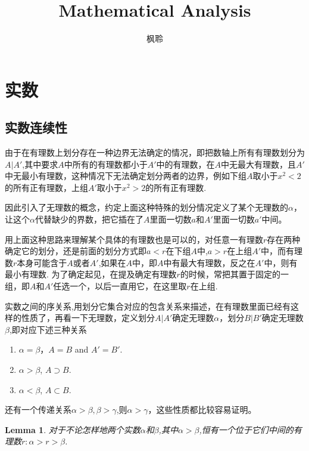 \documentclass{article}
\newtheorem{lemma}[theorem]{Lemma}
\begin{document}
\title{Mathematical Analysis}
\author{枫聆}
\maketitle
\tableofcontents

\newpage
\section{实数}
\subsection{实数连续性}

由于在有理数上划分存在一种边界无法确定的情况，即把数轴上所有有理数划分为$A|A'$,其中要求$A$中所有的有理数都小于$A'$中的有理数，在$A$中无最大有理数，且$A'$中无最小有理数，这种情况下{\color{red}无法确定划分两者的边界}，例如下组$A$取小于$x^2 < 2$的所有正有理数，上组$A'$取小于$x^2 > 2$的所有正有理数. 

因此引入了无理数的概念，约定上面这种特殊的划分情况定义了某个无理数的$\alpha$，让这个$\alpha$代替缺少的界数，把它插在了$A$里面一切数$a$和$A'$里面一切数$a'$中间。

用上面这种思路来理解某个具体的有理数也是可以的，对任意一有理数$r$存在两种确定它的划分，还是前面的划分方式即$a < r$在下组$A$中,$a > r$在上组$A'$中，而有理数$r$本身可能含于$A$或者$A'$,如果在$A$中，即$A$中有最大有理数，反之在$A'$中，则有最小有理数. 为了确定起见，在提及确定有理数$r$的时候，常把其置于固定的一组，即$A$和$A'$任选一个，以后一直用它，在这里取$r$在上组.

{\color{red} 实数之间的序关系,用划分它集合对应的包含关系来描述}，在有理数里面已经有这样的性质了，再看一下无理数，定义划分$A|A'$确定无理数$\alpha$，划分$B|B'$确定无理数$\beta$,即对应下述三种关系

\begin{enumerate}
	\item  $\alpha = \beta$，$A = B$ and $A' = B'$.
	\item  $\alpha > \beta$, $A \supset B$.
	\item  $\alpha < \beta$, $A \subset B$.
\end{enumerate}

还有一个传递关系$\alpha > \beta , \beta > \gamma$,则$\alpha > \gamma$，这些性质都比较容易证明。

\begin{lemma}
对于不论怎样地两个实数$\alpha$和$\beta$,其中$\alpha > \beta$,恒有一个位于它们中间的有理数$r \colon \alpha > r > \beta$.
\end{lemma}
\end{document}
